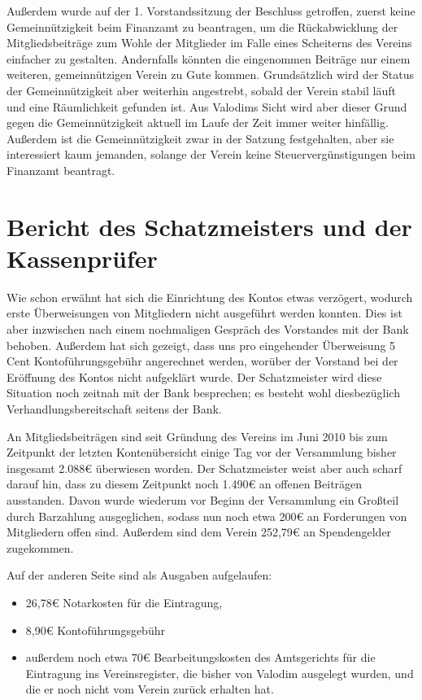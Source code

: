 \documentclass[a4paper,12pt]{scrartcl}
\begin{document}
Außerdem wurde auf der 1. Vorstandssitzung der Beschluss getroffen, zuerst keine
Gemeinnützigkeit beim Finanzamt zu beantragen, um die Rückabwicklung der
Mitgliedsbeiträge zum Wohle der Mitglieder im Falle eines Scheiterns des
Vereins einfacher zu gestalten. Andernfalls könnten die eingenommen Beiträge nur
einem weiteren, gemeinnützigen Verein zu Gute kommen. Grundsätzlich wird der
Status der Gemeinnützigkeit aber weiterhin angestrebt, sobald der Verein stabil
läuft und eine Räumlichkeit gefunden ist. Aus Valodims Sicht wird aber dieser
Grund gegen die Gemeinnützigkeit aktuell im Laufe der Zeit immer weiter
hinfällig. Außerdem ist die Gemeinnützigkeit zwar in der Satzung festgehalten,
aber sie interessiert kaum jemanden, solange der Verein keine
Steuervergünstigungen beim Finanzamt beantragt.

\section{Bericht des Schatzmeisters und der Kassenprüfer}
Wie schon erwähnt hat sich die Einrichtung des Kontos etwas verzögert, wodurch
erste Überweisungen von Mitgliedern nicht ausgeführt werden konnten. Dies ist
aber inzwischen nach einem nochmaligen Gespräch des Vorstandes mit der Bank
behoben. Außerdem hat sich gezeigt, dass uns pro eingehender Überweisung 5 Cent
Kontoführungsgebühr angerechnet werden, worüber der Vorstand bei der Eröffnung
des Kontos nicht aufgeklärt wurde. Der Schatzmeister wird diese Situation noch
zeitnah mit der Bank besprechen; es besteht wohl diesbezüglich
Verhandlungsbereitschaft seitens der Bank.

An Mitgliedsbeiträgen sind seit Gründung des Vereins im Juni 2010 bis zum 
Zeitpunkt der letzten Kontenübersicht einige Tag vor der Versammlung bisher 
insgesamt 2.088€ überwiesen worden. Der Schatzmeister weist aber auch scharf
darauf hin, dass zu diesem Zeitpunkt noch 1.490€ an offenen Beiträgen
ausstanden. Davon wurde wiederum vor Beginn der Versammlung ein Großteil durch
Barzahlung ausgeglichen, sodass nun noch etwa 200€ an Forderungen von
Mitgliedern offen sind. Außerdem sind dem Verein 252{,}79€ an Spendengelder
zugekommen.

Auf der anderen Seite sind als Ausgaben aufgelaufen:
\begin{itemize}
  \item 26{,}78€ Notarkosten für die Eintragung,
  \item 8{,}90€ Kontoführungsgebühr
  \item außerdem noch etwa 70€ Bearbeitungskosten des Amtsgerichts für die
    Eintragung ins Vereinsregister, die bisher von Valodim ausgelegt wurden, und
    die er noch nicht vom Verein zurück erhalten hat.
\end{itemize}
\end{document}
